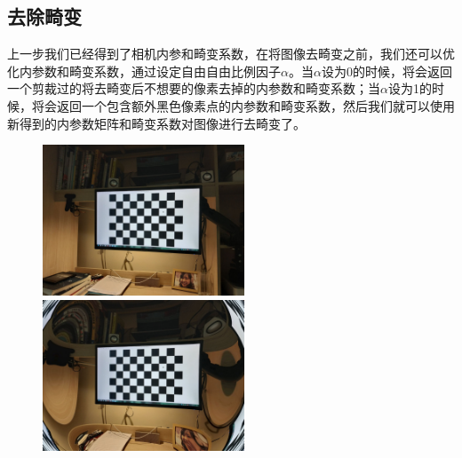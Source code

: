 \documentclass[]{article}
\begin{document}
    \subsection{去除畸变}
    上一步我们已经得到了相机内参和畸变系数，在将图像去畸变之前，我们还可以优化内参数和畸变系数，通过设定自由自由比例因子$\alpha$。当$\alpha$设为0的时候，将会返回一个剪裁过的将去畸变后不想要的像素去掉的内参数和畸变系数；当$\alpha$设为1的时候，将会返回一个包含额外黑色像素点的内参数和畸变系数，然后我们就可以使用新得到的内参数矩阵和畸变系数对图像进行去畸变了。

    \begin{figure}[htbp]
        \centering
        \begin{minipage}[t]{0.4\textwidth}
            \centering
            \includegraphics[width=6cm]{../code/test/0.jpg}
        \end{minipage}
        \begin{minipage}[t]{0.4\textwidth}
            \centering
            \includegraphics[width=6cm]{../code/test/0_jpg_undistorted.jpg}
        \end{minipage}


\end{figure}
\end{document}
